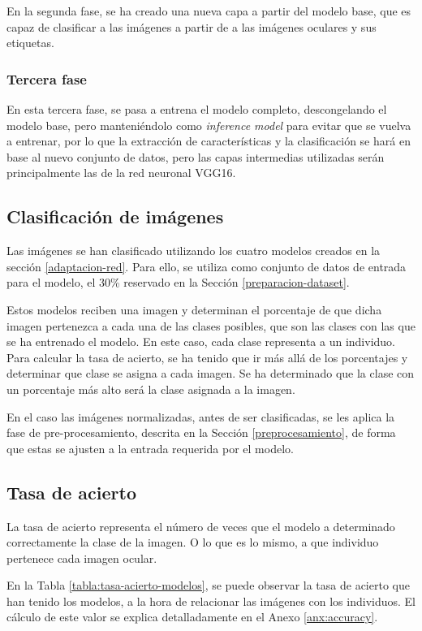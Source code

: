 En la segunda fase, se ha creado una nueva capa a partir del modelo base, que es capaz de clasificar a las imágenes a partir de a las imágenes oculares y sus etiquetas. 

\subsubsection{Tercera fase}

En esta tercera fase, se pasa a entrena el modelo completo, descongelando el modelo base, pero manteniéndolo como \textit{inference model} para evitar que se vuelva a entrenar, por lo que la extracción de características y la clasificación se hará en base al nuevo conjunto de datos, pero las capas intermedias utilizadas serán principalmente las de la red neuronal VGG16.

\subsection{Clasificación de imágenes}

Las imágenes se han clasificado utilizando los cuatro modelos creados en la sección \ref{adaptacion-red}. Para ello, se utiliza como conjunto de datos de entrada para el modelo, el 30\% reservado en la Sección \ref{preparacion-dataset}.

Estos modelos reciben una imagen y determinan el porcentaje de que dicha imagen pertenezca a cada una de las clases posibles, que son las clases con las que se ha entrenado el modelo. En este caso, cada clase representa a un individuo. Para calcular la tasa de acierto, se ha tenido que ir más allá de los porcentajes y determinar que clase se asigna a cada imagen. Se ha determinado que la clase con un porcentaje más alto será la clase asignada a la imagen.

En el caso las imágenes normalizadas, antes de ser clasificadas, se les aplica la fase de pre-procesamiento, descrita en la Sección \ref{preprocesamiento}, de forma que estas se ajusten a la entrada requerida por el modelo.

\subsection{Tasa de acierto} 

La tasa de acierto representa el número de veces que el modelo a determinado correctamente la clase de la imagen. O lo que es lo mismo, a que individuo pertenece cada imagen ocular.

En la Tabla \ref{tabla:tasa-acierto-modelos}, se puede observar la tasa de acierto que han tenido los modelos, a la hora de relacionar las imágenes
 con los individuos. El cálculo de este valor se explica detalladamente en el Anexo \ref{anx:accuracy}.

